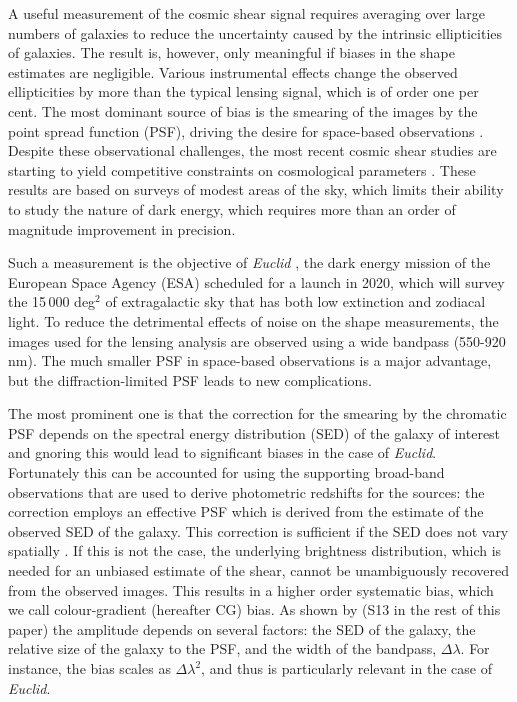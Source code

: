 \documentclass[useAMS,usenatbib]{mnras}
\begin{document}
A useful measurement of the cosmic shear signal requires averaging over large numbers of galaxies
to reduce the uncertainty caused by the intrinsic ellipticities of galaxies. The result is, however, only meaningful if biases in the shape estimates are negligible. Various instrumental effects change the observed ellipticities by more than the typical lensing signal, which is of order one per cent.
The most dominant source of bias is the smearing of the images by the point spread function (PSF),
driving the desire for space-based observations \citep{Paulin-Henriksson08, Massey13}.
Despite these observational challenges, the most recent cosmic shear studies are starting to yield competitive constraints on cosmological parameters \citep{Heymans13, Jarvis16,Jee16,Hildebrandt17}.
These results are based on surveys of modest areas of the sky, which limits their ability to study the nature of dark energy, which requires more than an order of magnitude improvement in precision.

Such a measurement is the objective of {\it Euclid} \citep{Laureijs11}, the dark energy mission of the European Space Agency (ESA) scheduled for a launch in 2020, which will survey the 
15\,000 deg$^2$ of extragalactic sky that has both low extinction and zodiacal light. To reduce the detrimental effects of noise on the shape measurements, the images used for the lensing analysis are observed using a wide bandpass (550-920\,nm). The much smaller PSF in space-based observations 
is a major advantage, but the diffraction-limited PSF leads to new complications. 

The most prominent one is that the correction for the smearing by the chromatic PSF depends on the spectral energy distribution (SED) of the galaxy of interest \citep{Cypriano10, Eriksen17} and gnoring this would lead to significant biases in the case of {\it Euclid}. Fortunately this can be accounted for using the supporting broad-band observations that are used to derive photometric redshifts for the sources: the correction employs an effective PSF which is derived from the estimate of the observed SED of the galaxy. This correction is sufficient if the SED does not vary spatially \citep{Eriksen17}. If this is not the case, the underlying brightness distribution, which is needed for an unbiased estimate of the shear, cannot be unambiguously recovered from the observed images.
This results in a higher order systematic bias, which we call colour-gradient (hereafter CG) bias.
As shown by \cite{Semboloni13} (S13 in the rest of this paper) the amplitude depends on several factors: the SED of the galaxy, the relative size of the galaxy to the PSF, and the width of the bandpass, $\Delta\lambda$.  For instance, the bias scales as $\Delta\lambda^2$, and thus is particularly relevant in the case of {\it Euclid}.
\end{document}
